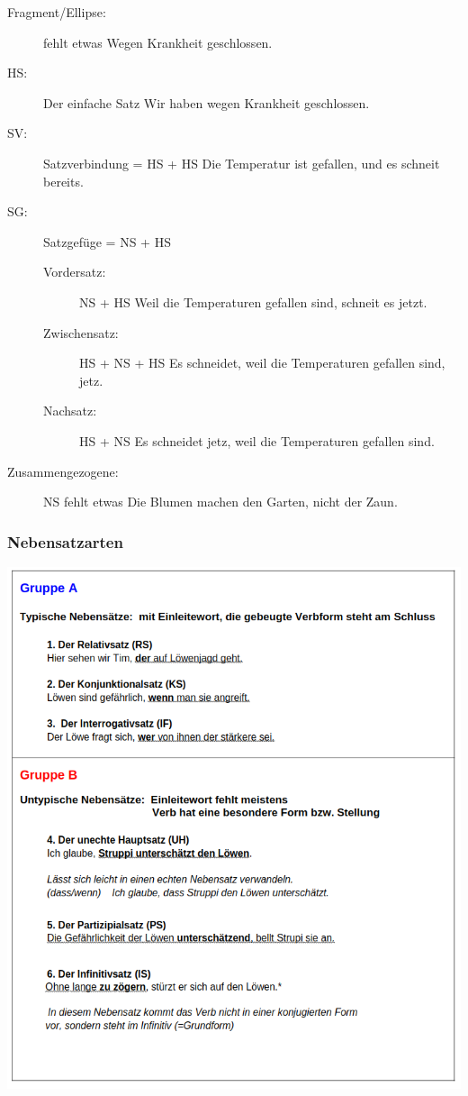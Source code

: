 \begin{description}
    \item[Fragment/Ellipse:] fehlt etwas \arrow Wegen Krankheit geschlossen.
    \item[HS:] Der einfache Satz \arrow Wir haben wegen Krankheit geschlossen.
    \item[SV:] Satzverbindung = HS + HS \arrow Die Temperatur ist gefallen, und es schneit bereits.
    \item[SG:] Satzgefüge = NS + HS
    \begin{description}
        \item[Vordersatz:] NS + HS \arrow Weil die Temperaturen gefallen sind, schneit es jetzt.
        \item[Zwischensatz:] HS + NS + HS \arrow Es schneidet, weil die Temperaturen gefallen sind, jetz.
        \item[Nachsatz:] HS + NS \arrow Es schneidet jetz, weil die Temperaturen gefallen sind.
    \end{description}
    \item[Zusammengezogene:] NS fehlt etwas \arrow Die Blumen machen den Garten, nicht der Zaun.
\end{description}

\subsubsection{Nebensatzarten}

\includegraphics[width=\textwidth]{./german/imgs/nebensatz.png}

